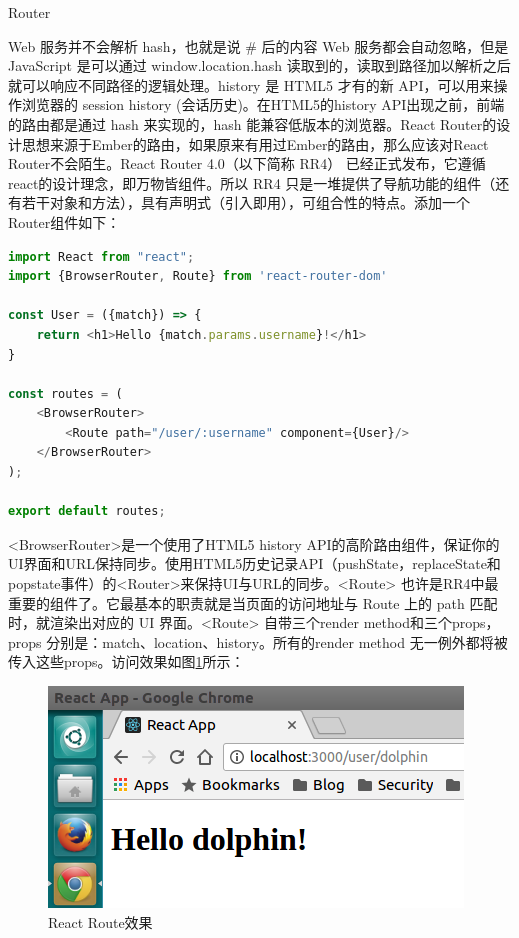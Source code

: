 \documentclass[12pt]{book}
\makeatletter
\numberwithin{dummy}{section}
\theoremstyle{ocrenumbox}
\theoremstyle{blacknumex}
\theoremstyle{blacknumbox}
\theoremstyle{ocrenum}
\renewcommand{\subsection}{\@startsection {subsection}{2}{\z@}
	{-3ex \@plus -0.1ex \@minus -.4ex}
	{0.5ex \@plus.2ex }
	{\normalfont\sffamily\bfseries}}
\makeatother
\begin{document}
\subsection{Router}

Web 服务并不会解析 hash，也就是说 \# 后的内容 Web 服务都会自动忽略，但是 JavaScript 是可以通过 window.location.hash 读取到的，读取到路径加以解析之后就可以响应不同路径的逻辑处理。history 是 HTML5 才有的新 API，可以用来操作浏览器的 session history (会话历史)。在HTML5的history API出现之前，前端的路由都是通过 hash 来实现的，hash 能兼容低版本的浏览器。React Router的设计思想来源于Ember的路由，如果原来有用过Ember的路由，那么应该对React Router不会陌生。React Router 4.0（以下简称 RR4） 已经正式发布，它遵循react的设计理念，即万物皆组件。所以 RR4 只是一堆提供了导航功能的组件（还有若干对象和方法），具有声明式（引入即用），可组合性的特点。添加一个Router组件如下：

\begin{lstlisting}[language=Javascript]
import React from "react";
import {BrowserRouter, Route} from 'react-router-dom'

const User = ({match}) => {
	return <h1>Hello {match.params.username}!</h1>
}

const routes = (
	<BrowserRouter>
		<Route path="/user/:username" component={User}/>
	</BrowserRouter>
);

export default routes;
\end{lstlisting}

<BrowserRouter>是一个使用了HTML5 history API的高阶路由组件，保证你的UI界面和URL保持同步。使用HTML5历史记录API（pushState，replaceState和popstate事件）的<Router>来保持UI与URL的同步。<Route> 也许是RR4中最重要的组件了。它最基本的职责就是当页面的访问地址与 Route 上的 path 匹配时，就渲染出对应的 UI 界面。<Route> 自带三个render method和三个props，props 分别是：match、location、history。所有的render method 无一例外都将被传入这些props。访问效果如图\ref{fig:firstroute}所示：

\begin{figure}[htbp]
	\centering
	\includegraphics[scale=0.6]{firstroute.png}
	\caption{React Route效果}
	\label{fig:firstroute}
\end{figure}
\end{document}
